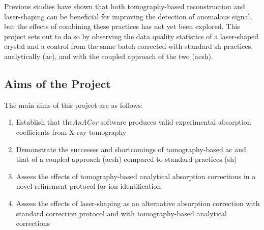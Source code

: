 Previous studies have shown that both tomography-based reconstruction and laser-shaping can be beneficial for improving the detection of anomalous signal, but the effects of combining these practices has not yet been explored. This project sets out to do so by observing the data quality statistics of a laser-shaped crystal and a control from the same batch corrected with standard \ac{sh} practices, analytically (\ac{ac}), and with the coupled approach of the two (\ac{acsh}).

\subsection{Aims of the Project} %

The main aims of this project are as follows:

\begin{enumerate}
    \item Establish that the\textit{AnACor} software produces valid experimental absorption coefficients from X-ray tomography
    \item Demonstrate the successes and shortcomings of tomography-based \ac{ac} and that of a coupled approach (\ac{acsh}) compared to standard practices (\ac{sh})
    \item Assess the effects of tomography-based analytical absorption corrections in a novel refinement protocol for ion-identification
    \item Assess the effects of laser-shaping as an alternative absorption correction with standard correction protocol and with tomography-based analytical corrections
\end{enumerate}

